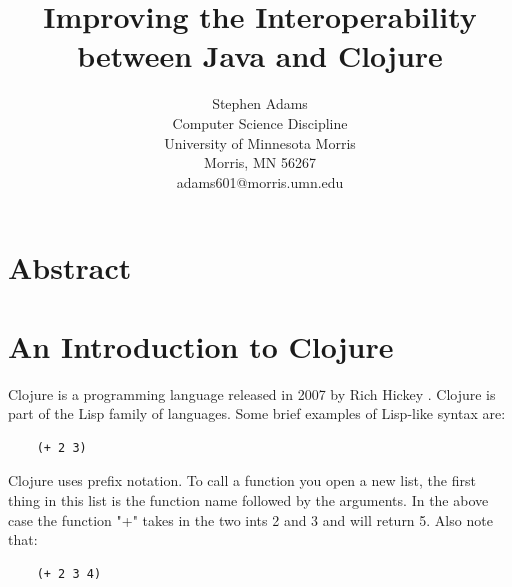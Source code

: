 \documentclass[12pt]{article}
\begin{document}
\pagestyle{plain}
%

\title{Improving the Interoperability between Java and Clojure}
%
%

\author{
Stephen Adams \\
Computer Science Discipline \\
University of Minnesota Morris\\
Morris, MN 56267\\
adams601@morris.umn.edu
}

\date{}

\maketitle
\thispagestyle{empty}

\section*{\centering Abstract}



\newpage
\setcounter{page}{1}

\section{An Introduction to Clojure}\label{sec:intro}
	Clojure is a programming language released in 2007 by Rich Hickey \cite{wiki}. Clojure is part of the Lisp family of languages. Some brief examples of Lisp-like syntax are:
	\begin{verbatim}
	(+ 2 3)
	\end{verbatim}
	Clojure uses prefix notation. To call a function you open a new list, the first thing in this list is the function name followed by the arguments. In the above case the function "+" takes in the two ints 2 and 3 and will return 5. Also note that:
	\begin{verbatim}
	(+ 2 3 4)
	\end{verbatim} 
	
\end{document}
